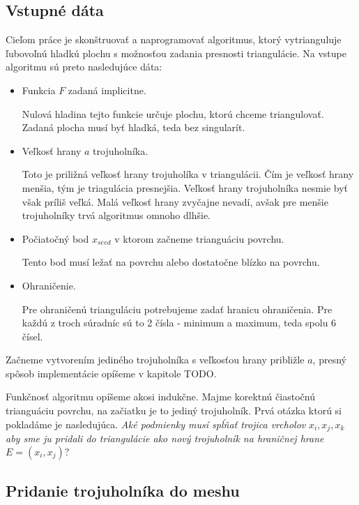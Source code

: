 \subsection{Vstupné dáta}
\label{kap:input_data}
Cieľom práce je skonštruovať a naprogramovať algoritmus, ktorý vytrianguluje ľubovoľnú hladkú plochu s 
možnosťou zadania presnosti triangulácie. Na vstupe algoritmu sú preto nasledujúce dáta:
\begin{itemize}
    \item{
        Funkcia $F$ zadaná implicitne.

        Nulová hladina tejto funkcie určuje plochu, ktorú chceme triangulovať. 
        Zadaná plocha musí byť hladká, teda bez singularít.
    }
    \item{
        Veľkosť hrany $a$ trojuholníka.

        Toto je priližná veľkosť hrany trojuholíka v triangulácii. 
        Čím je veľkosť hrany menšia, tým je triagulácia presnejšia. Veľkosť hrany trojuholníka 
        nesmie byť však príliš veľká. Malá veľkosť hrany zvyčajne nevadí, avšak pre 
        menšie trojuholníky trvá algoritmus omnoho dlhšie.
    }
    \item{
        Počiatočný bod $x_{seed}$ v ktorom začneme trianguáciu povrchu. 

        Tento bod musí ležať na povrchu alebo dostatočne blízko na povrchu.
    }
    \item{
        Ohraničenie.

        Pre ohraničenú trianguláciu potrebujeme zadať hranicu ohraničenia. Pre každú z troch súradníc 
        sú to 2 čísla - minimum a maximum, teda spolu 6 čísel.
    }
\end{itemize}

Začneme vytvorením jediného trojuholníka s veľkosťou hrany približle $a$, presný spôsob implementácie
opíšeme v kapitole TODO.

Funkčnosť algoritmu opíšeme akosi indukčne. Majme korektnú čiastočnú trianguáciu povrchu, na začiatku
je to jediný trojuholník. Prvá otázka ktorú si pokladáme je nasledujúca. 
\textit{Aké podmienky musí spĺňať trojica vrcholov} $x_i, x_j, x_k$ 
\textit{aby sme ju pridali do triangulácie ako nový trojuholník na hraničnej hrane} $E = (x_i, x_j)?$ 

\subsection{Pridanie trojuholníka do meshu}
\label{kap:triangle_conditions}

